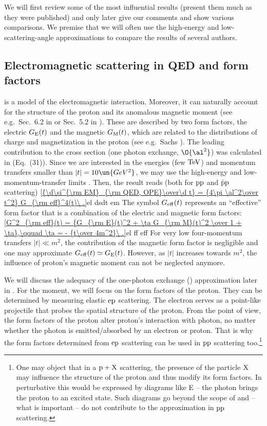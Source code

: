 We will first review some of the most influential results (present them much as they were published) and only later give our comments and show various comparisons. We premise that we will often use the high-energy and low-scattering-angle approximations to compare the results of several authors.


\subsection[em sc qed]{Electromagnetic scattering in QED and form factors}

 is a  model of the electromagnetic interaction. Moreover, it can naturally account for the structure of the proton and its anomalous magnetic moment (see e.g.~Sec.~6.2 in  or Sec.~5.2 in ). These are described by two form factors, the electric $G_{\rm E}(t)$ and the magnetic $G_{\rm M}(t)$, which are related to the distributions of charge and magnetization in the proton (see e.g.~Sachs ). The leading contribution to the cross section (one photon exchange, $\O{\al^2}$) was calculated in  (Eq.~(31)). Since we are interested in the  energies (few $\rm TeV$) and momentum transfers smaller than $|t| = 10\un{GeV^2}$, we may use the high-energy and low-momentum-transfer limits . Then, the result reads (both for $\rm pp$ and $\rm \bar p p$ scattering)
\eqref{{\d\si^{\rm EM}_{\rm QED, OPE}\over\d t} = {4\pi \al^2\over t^2} G_{\rm eff}^4(t)\ .}{el dsdt em}
The symbol $G_{\rm eff}(t)$ represents an ``effective'' form factor that is a combination of the electric and magnetic form factors:
\eqref{G^2_{\rm eff}(t) = {G_{\rm E}(t)^2 + \ta G_{\rm M}(t)^2 \over 1 + \ta},\qquad \ta = - {t\over 4m^2}\ .}{el ff eff}
For very low four-momentum transfers $|t| \ll m^2$, the contribution of the magnetic form factor is negligible and one may approximate $G_{\rm eff}(t) \simeq G_{\rm E}(t)$. However, as $|t|$ increases towards $m^2$, the influence of proton's magnetic moment can not be neglected anymore.

We will discuss the adequacy of the one-photon exchange () approximation later in . For the moment, we will focus on the form factors of the proton. They can be determined by measuring elastic $\rm ep$ scattering. The electron serves as a point-like projectile that probes the spatial structure of the proton. From the  point of view, the form factors of the proton alter proton's interaction with photon, no matter whether the photon is emitted/absorbed by an electron or proton. That is why the form factors determined from $\rm ep$ scattering can be used in $\rm pp$ scattering too.\footnote{%
One may object that in a $\rm p+X$ scattering, the presence of the particle $\rm X$ may influence the structure of the proton and thus modify its form factors. In perturbative  this would be expressed by diagrams like  E -- the photon brings the proton to an excited state. Such diagrams go beyond the scope of  and -- what is important -- do not contribute to the  approximation in $\rm pp$ scattering.
}

